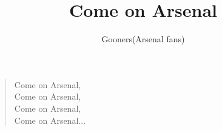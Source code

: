 \documentclass[a4paper,12pt]{article}
\title{Come on Arsenal}
\author{Gooners(Arsenal fans)}
\date{}
\begin{document}
	
	\maketitle
	
	\begin{verse}
		
		Come on Arsenal, \\
		Come on Arsenal, \\
		Come on Arsenal, \\
		Come on Arsenal$\ldots$
		
	\end{verse}
	
\end{document}
